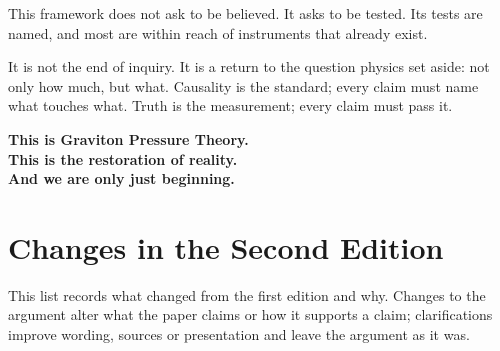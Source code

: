 \documentclass[11pt,a4paper]{article}
\begin{document}
This framework does not ask to be believed. It asks to be tested. Its tests are named, and most are within reach of instruments that already exist.

It is not the end of inquiry. It is a return to the question physics set aside: not only how much, but what. Causality is the standard; every claim must name what touches what. Truth is the measurement; every claim must pass it.

\vspace{1.5em}
\begin{center}\large
\textbf{This is Graviton Pressure Theory.}\\[0.6em]
\textbf{This is the restoration of reality.}\\[0.6em]
\textbf{And we are only just beginning.}
\end{center}

\clearpage
\section*{Changes in the Second Edition}

This list records what changed from the first edition and why. Changes to the argument alter what the paper claims or how it supports a claim; clarifications improve wording, sources or presentation and leave the argument as it was.
\end{document}
